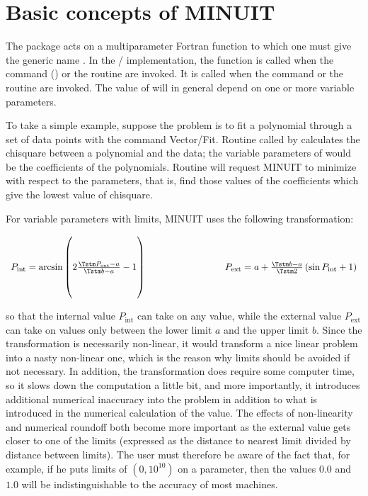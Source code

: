 \section{Basic concepts of MINUIT}

The \MINUIT{} package acts on a multiparameter Fortran function to which one
must give the generic name .
In the \PAW/\HBOOK{} implementation, the function  is called
 when the command  (\PAW)
or the routine  are invoked. 
It is called 
when the command  or the routine  are invoked.
The value of  will in general depend on one or more variable parameters.

To take a simple example, suppose the problem is to fit a polynomial through
a set of data points with the command Vector/Fit.
Routine  called by  calculates the chisquare between a
polynomial and the data; the variable parameters of  would be the
coefficients of the polynomials. 
Routine  will request MINUIT to minimize 
with respect to the parameters, that is, find those
values of the coefficients which give the lowest value of chisquare.


For variable parameters with limits, MINUIT uses the following transformation:

\HTML{\PRE}
\[
\begin{array}{l@{\hspace{3cm}}l}
P_{\mathrm{int}} = \arcsin
        \left( 2 \frac{\Tstm P_{\mathrm{ext}}-a\Rule}{\Tstm b-a} - 1 \right)       &
P_{\mathrm{ext}} = a + \frac{\Tstm b - a}{\Tstm 2}
        \left( \sin P_{\mathrm{int}} + 1 \right)                  \\
\end{array}
\]
\HTML{\ePRE}

so that the internal value $P_{\mathrm{int}}$ can take on any value, while
the external value $P_{\mathrm{ext}}$ can take on values only between the lower
limit $a$ and the upper limit $b$.
Since the transformation is necessarily non-linear, it would transform a
nice linear problem into a nasty non-linear one, which is the reason why
limits should be avoided if not necessary. 
In addition, the transformation
does require some computer time, so it slows down the computation a little
bit, and more importantly, it introduces additional numerical inaccuracy into
the problem in addition to what is introduced in the numerical calculation
of the  value.  
The effects of non-linearity and numerical roundoff both
become more important as the external value gets closer to one of the limits
(expressed as the distance to nearest limit divided by distance between limits).
The user must therefore be aware of the fact that, for example,
if he puts limits of $(0,10^{10})$ on a parameter, then the values $0.0$ 
and $1.0$ will be indistinguishable to the accuracy of most machines.

